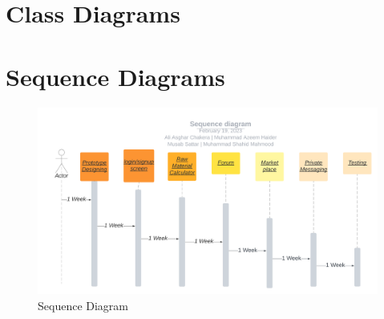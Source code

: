 \documentclass{article}
\begin{document}
\section*{Class Diagrams}

\section*{Sequence Diagrams}
\centering
\begin{figure}[!h]
    \includegraphics[width=1\linewidth]{Sequence diagram.png}
    \caption{Sequence Diagram}
    \label{fig:seq}
\end{figure}
\end{document}
